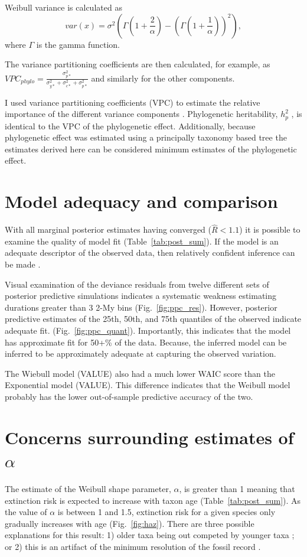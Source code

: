 \documentclass{article}
\begin{document}
Weibull variance is calculated as
\begin{equation}
  var(x) = \sigma^{2}\left(\Gamma\left(1 + \frac{2}{\alpha}\right) - \left(\Gamma\left(1 + \frac{1}{\alpha}\right)\right)^{2}\right),
  \label{eq:wei_var}
\end{equation}
where \(\Gamma\) is the gamma function. 

The variance partitioning coefficients are then calculated, for example, as \(VPC_{phylo} = \frac{\sigma_{p*}^{2}}{\sigma_{y*}^{2} + \sigma_{c*}^{2} + \sigma_{p*}^{2}}\) and similarly for the other components.

I used variance partitioning coefficients (VPC) to estimate the relative importance of the different variance components \cite{Gelman2007}. Phylogenetic heritability, \(h_{p}^{2}\) \cite{Lynch1991,Housworth2004}, is identical to the VPC of the phylogenetic effect. Additionally, because phylogenetic effect was estimated using a principally taxonomy based tree the estimates derived here can be considered minimum estimates of the phylogenetic effect.


\section{Model adequacy and comparison}
With all marginal posterior estimates having converged (\(\hat{R} < 1.1\)) it is possible to examine the quality of model fit (Table~\ref{tab:post_sum}). If the model is an adequate descriptor of the observed data, then relatively confident inference can be made \cite{Gelman2013d}.

Visual examination of the deviance residuals from twelve different sets of posterior predictive simulations indicates a systematic weakness estimating durations greater than 3 2-My bins (Fig.~\ref{fig:ppc_res}). However, posterior predictive estimates of the 25th, 50th, and 75th quantiles of the observed indicate adequate fit. (Fig.~\ref{fig:ppc_quant}). Importantly, this indicates that the model has approximate fit for 50+\% of the data. Because, the inferred model can be inferred to be approximately adequate at capturing the observed variation.

The Wiebull model (VALUE) also had a much lower WAIC score than the Exponential model (VALUE). This difference indicates that the Weibull model probably has the lower out-of-sample predictive accuracy of the two.


\section{Concerns surrounding estimates of $\alpha$}
The estimate of the Weibull shape parameter, $\alpha$, is greater than 1 meaning that extinction risk is expected to increase with taxon age (Table~\ref{tab:post_sum}). As the value of $\alpha$ is between 1 and 1.5, extinction risk for a given species only gradually increases with age (Fig.~\ref{fig:haz}). There are three possible explanations for this result: 1) older taxa being out competed by younger taxa \cite{Wagner2014b}; or 2) this is an artifact of the minimum resolution of the fossil record \cite{Sepkoski1975}. 
\end{document}

